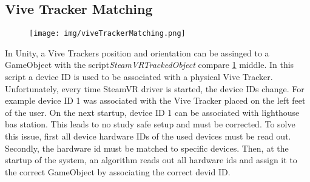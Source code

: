 \subsection{Vive Tracker Matching}
\begin{figure}
	\centering
	\texttt{[image: img/viveTrackerMatching.png]}
	\caption{}
	\label{fig:viveTrackerMatching}
\end{figure}
In Unity, a Vive Trackers position and orientation can be assinged to a GameObject with the script\textit{SteamVRTrackedObject} compare \ref{fig:viveTrackerMatching} middle. In this script a device ID is used to be associated with a physical Vive Tracker. Unfortunately, every time SteamVR driver is started, the device IDs change. For example device ID 1 was associated with the Vive Tracker placed on the left feet of the user. On the next startup, device ID 1 can be associated with lighthouse bas station. This leads to no study safe setup and must be corrected. To solve this issue, first all device hardware IDs of the used devices must be read out. Secondly, the hardware id must be matched to specific devices. Then, at the startup of the system, an algorithm reads out all hardware ids and assign it to the correct GameObject by associating the correct devid ID. 

